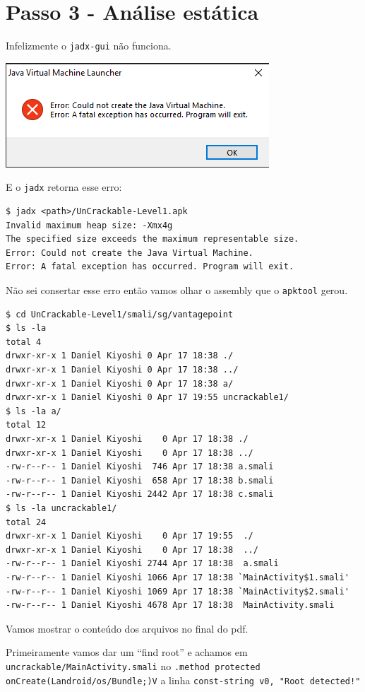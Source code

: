 \documentclass{article}
\begin{document}
\newpage
\section*{Passo 3 - Análise estática}

Infelizmente o \texttt{jadx-gui} não funciona.

\includegraphics[scale=1]{imports/jadxNaoFunciona.png}

E o \texttt{jadx} retorna esse erro:
\begin{verbatim}
$ jadx <path>/UnCrackable-Level1.apk
Invalid maximum heap size: -Xmx4g
The specified size exceeds the maximum representable size.
Error: Could not create the Java Virtual Machine.
Error: A fatal exception has occurred. Program will exit.
\end{verbatim}

Não sei consertar esse erro então vamos olhar o assembly que o
\texttt{apktool} gerou.

\begin{verbatim}
$ cd UnCrackable-Level1/smali/sg/vantagepoint
$ ls -la
total 4
drwxr-xr-x 1 Daniel Kiyoshi 0 Apr 17 18:38 ./
drwxr-xr-x 1 Daniel Kiyoshi 0 Apr 17 18:38 ../
drwxr-xr-x 1 Daniel Kiyoshi 0 Apr 17 18:38 a/
drwxr-xr-x 1 Daniel Kiyoshi 0 Apr 17 19:55 uncrackable1/
$ ls -la a/
total 12
drwxr-xr-x 1 Daniel Kiyoshi    0 Apr 17 18:38 ./
drwxr-xr-x 1 Daniel Kiyoshi    0 Apr 17 18:38 ../
-rw-r--r-- 1 Daniel Kiyoshi  746 Apr 17 18:38 a.smali
-rw-r--r-- 1 Daniel Kiyoshi  658 Apr 17 18:38 b.smali
-rw-r--r-- 1 Daniel Kiyoshi 2442 Apr 17 18:38 c.smali
$ ls -la uncrackable1/
total 24
drwxr-xr-x 1 Daniel Kiyoshi    0 Apr 17 19:55  ./
drwxr-xr-x 1 Daniel Kiyoshi    0 Apr 17 18:38  ../
-rw-r--r-- 1 Daniel Kiyoshi 2744 Apr 17 18:38  a.smali
-rw-r--r-- 1 Daniel Kiyoshi 1066 Apr 17 18:38 `MainActivity$1.smali'
-rw-r--r-- 1 Daniel Kiyoshi 1069 Apr 17 18:38 `MainActivity$2.smali'
-rw-r--r-- 1 Daniel Kiyoshi 4678 Apr 17 18:38  MainActivity.smali
\end{verbatim}

Vamos mostrar o conteúdo dos arquivos no final do pdf.

Primeiramente vamos dar um ``find root'' e achamos
em \texttt{uncrackable/MainActivity.smali}
no \texttt{.method protected onCreate(Landroid/os/Bundle;)V}
a linha \texttt{const-string v0, "Root detected!"}
\end{document}
